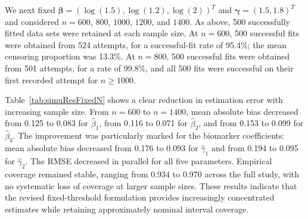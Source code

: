 We next fixed $\boldsymbol\beta=(\log(1.5),\log(1.2),\log(2))^{T}$ and $\boldsymbol\gamma=(1.5,1.8)^{T}$ and considered $n=600$, $800$, $1000$, $1200$, and $1400$. As above, 500 successfully fitted data sets were retained at each sample size. At $n=600$, 500 successful fits were obtained from 524 attempts, for a successful-fit rate of 95.4\%; the mean censoring proportion was 13.3\%. At $n=800$, 500 successful fits were obtained from 501 attempts, for a rate of 99.8\%, and all 500 fits were successful on their first recorded attempt for $n\geq1000$.

Table~\ref{tab:simuResFixedN} shows a clear reduction in estimation error with increasing sample size. From $n=600$ to $n=1400$, mean absolute bias decreased from 0.125 to 0.083 for $\hat\beta_1$, from 0.116 to 0.071 for $\hat\beta_2$, and from 0.153 to 0.099 for $\hat\beta_3$. The improvement was particularly marked for the biomarker coefficients: mean absolute bias decreased from 0.176 to 0.093 for $\hat\gamma_1$ and from 0.194 to 0.095 for $\hat\gamma_2$. The RMSE decreased in parallel for all five parameters. Empirical coverage remained stable, ranging from 0.934 to 0.970 across the full study, with no systematic loss of coverage at larger sample sizes. These results indicate that the revised fixed-threshold formulation provides increasingly concentrated estimates while retaining approximately nominal interval coverage.

